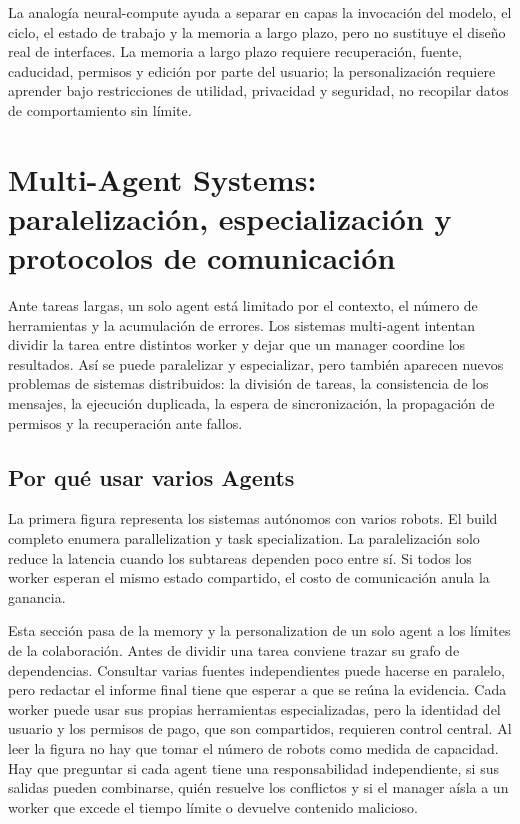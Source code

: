\documentclass[a4paper]{article}
\begin{document}
La analogía neural-compute ayuda a separar en capas la invocación del modelo, el ciclo, el estado de trabajo y la memoria a largo plazo, pero no sustituye el diseño real de interfaces. La memoria a largo plazo requiere recuperación, fuente, caducidad, permisos y edición por parte del usuario; la personalización requiere aprender bajo restricciones de utilidad, privacidad y seguridad, no recopilar datos de comportamiento sin límite.
\section{Multi-Agent Systems: paralelización, especialización y protocolos de comunicación}

Ante tareas largas, un solo agent está limitado por el contexto, el número de herramientas y la acumulación de errores. Los sistemas multi-agent intentan dividir la tarea entre distintos worker y dejar que un manager coordine los resultados. Así se puede paralelizar y especializar, pero también aparecen nuevos problemas de sistemas distribuidos: la división de tareas, la consistencia de los mensajes, la ejecución duplicada, la espera de sincronización, la propagación de permisos y la recuperación ante fallos.

\subsection{Por qué usar varios Agents}

La primera figura representa los sistemas autónomos con varios robots. El build completo enumera parallelization y task specialization. La paralelización solo reduce la latencia cuando los subtareas dependen poco entre sí. Si todos los worker esperan el mismo estado compartido, el costo de comunicación anula la ganancia.

Esta sección pasa de la memory y la personalization de un solo agent a los límites de la colaboración. Antes de dividir una tarea conviene trazar su grafo de dependencias. Consultar varias fuentes independientes puede hacerse en paralelo, pero redactar el informe final tiene que esperar a que se reúna la evidencia. Cada worker puede usar sus propias herramientas especializadas, pero la identidad del usuario y los permisos de pago, que son compartidos, requieren control central. Al leer la figura no hay que tomar el número de robots como medida de capacidad. Hay que preguntar si cada agent tiene una responsabilidad independiente, si sus salidas pueden combinarse, quién resuelve los conflictos y si el manager aísla a un worker que excede el tiempo límite o devuelve contenido malicioso.
\end{document}
